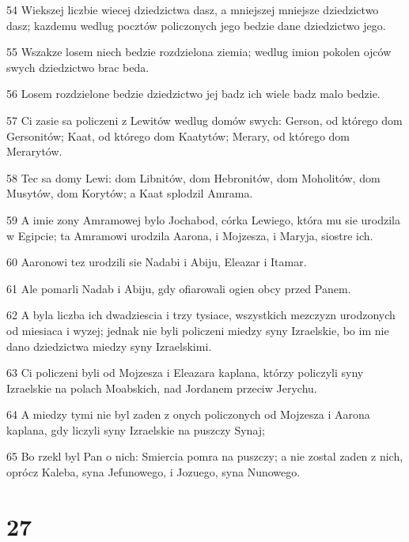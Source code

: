 \par 54 Wiekszej liczbie wiecej dziedzictwa dasz, a mniejszej mniejsze dziedzictwo dasz; kazdemu wedlug pocztów policzonych jego bedzie dane dziedzictwo jego.
\par 55 Wszakze losem niech bedzie rozdzielona ziemia; wedlug imion pokolen ojców swych dziedzictwo brac beda.
\par 56 Losem rozdzielone bedzie dziedzictwo jej badz ich wiele badz malo bedzie.
\par 57 Ci zasie sa policzeni z Lewitów wedlug domów swych: Gerson, od którego dom Gersonitów; Kaat, od którego dom Kaatytów; Merary, od którego dom Merarytów.
\par 58 Tec sa domy Lewi: dom Libnitów, dom Hebronitów, dom Moholitów, dom Musytów, dom Korytów; a Kaat splodzil Amrama.
\par 59 A imie zony Amramowej bylo Jochabod, córka Lewiego, która mu sie urodzila w Egipcie; ta Amramowi urodzila Aarona, i Mojzesza, i Maryja, siostre ich.
\par 60 Aaronowi tez urodzili sie Nadabi i Abiju, Eleazar i Itamar.
\par 61 Ale pomarli Nadab i Abiju, gdy ofiarowali ogien obcy przed Panem.
\par 62 A byla liczba ich dwadziescia i trzy tysiace, wszystkich mezczyzn urodzonych od miesiaca i wyzej; jednak nie byli policzeni miedzy syny Izraelskie, bo im nie dano dziedzictwa miedzy syny Izraelskimi.
\par 63 Ci policzeni byli od Mojzesza i Eleazara kaplana, którzy policzyli syny Izraelskie na polach Moabskich, nad Jordanem przeciw Jerychu.
\par 64 A miedzy tymi nie byl zaden z onych policzonych od Mojzesza i Aarona kaplana, gdy liczyli syny Izraelskie na puszczy Synaj;
\par 65 Bo rzekl byl Pan o nich: Smiercia pomra na puszczy; a nie zostal zaden z nich, oprócz Kaleba, syna Jefunowego, i Jozuego, syna Nunowego.

\chapter{27}

